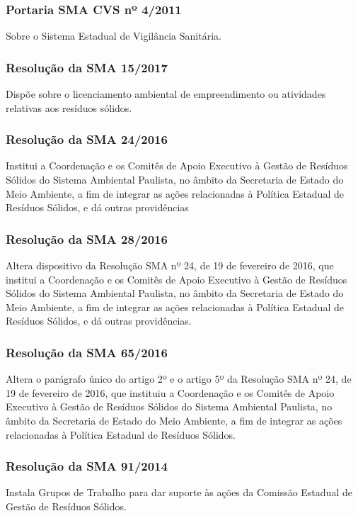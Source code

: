 \begin{subapend}
\begin{subsubapend}
		\subsubsection{Portaria SMA CVS nº 4/2011}
		Sobre o Sistema Estadual de Vigilância Sanitária.
		\subsubsection{Resolução da SMA 15/2017}
		Dispõe sobre o licenciamento ambiental de empreendimento ou atividades relativas aos resíduos sólidos.
		\subsubsection{Resolução da SMA 24/2016}
		Institui a Coordenação e os Comitês de Apoio Executivo à Gestão de Resíduos Sólidos do Sistema Ambiental Paulista, no âmbito da Secretaria de Estado do Meio Ambiente, a fim de integrar as ações relacionadas à Política Estadual de Resíduos Sólidos, e dá outras providências
		\subsubsection{Resolução da SMA 28/2016}
		Altera dispositivo da Resolução SMA nº 24, de 19 de fevereiro de 2016, que institui a Coordenação e os Comitês de Apoio Executivo à Gestão de Resíduos Sólidos do Sistema Ambiental Paulista, no âmbito da Secretaria de Estado do Meio Ambiente, a fim de integrar as ações relacionadas à Política Estadual de Resíduos Sólidos, e dá outras providências.
		\subsubsection{Resolução da SMA 65/2016}
		Altera o parágrafo único do artigo 2º e o artigo 5º da Resolução SMA nº 24, de 19 de fevereiro de 2016, que instituiu a Coordenação e os Comitês de Apoio Executivo à Gestão de Resíduos Sólidos do Sistema Ambiental Paulista, no âmbito da Secretaria de Estado do Meio Ambiente, a fim de integrar as ações relacionadas à Política Estadual de Resíduos Sólidos.
		\subsubsection{Resolução da SMA 91/2014}
		Instala Grupos de Trabalho para dar suporte às ações da Comissão Estadual de Gestão de Resíduos Sólidos.
	\end{subsubapend}
\end{subapend}

